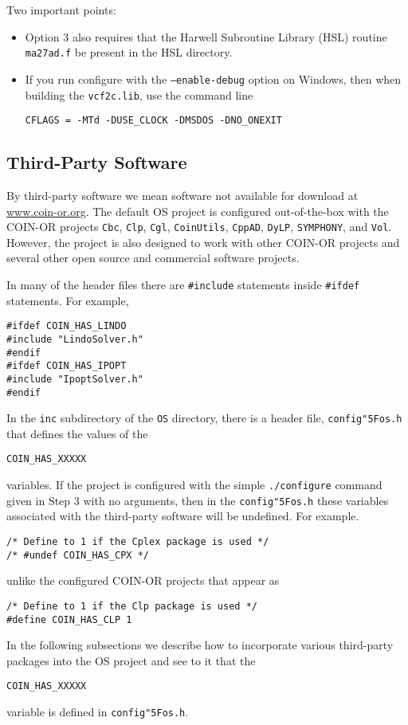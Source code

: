 \documentclass[11pt]{article}
\renewcommand{\_}{{\char"5F}}
\renewcommand{\{}{{\char"7B}}
\renewcommand{\}}{{\char"7D}}
\renewcommand{\^}{{\char"0D}}
\renewcommand{\'}{{\char"0D}}
\begin{document}
\noindent Two important points:


\begin{itemize}
\item Option 3 also requires that the  Harwell Subroutine Library (HSL) routine {\tt ma27ad.f} be present in the HSL directory.

\item If you run configure with the {\tt --enable-debug} option on Windows, then when building the {\tt vcf2c.lib}, use the command line

\begin{verbatim}
CFLAGS = -MTd -DUSE_CLOCK -DMSDOS -DNO_ONEXIT
\end{verbatim}

\end{itemize}





\subsection{Third-Party Software}

By third-party software we mean software not available for download at \url{www.coin-or.org}. The default OS project is configured out-of-the-box with the COIN-OR  projects {\tt Cbc}, {\tt Clp}, {\tt Cgl}, {\tt CoinUtils}, {\tt CppAD},  {\tt DyLP}, {\tt SYMPHONY}, and {\tt Vol}.  However, the project is also designed to work with other COIN-OR projects and several other open source and commercial software projects.

In many of the header files there are {\tt \#include} statements inside {\tt  \#ifdef}  statements. For example,
\begin{verbatim}
#ifdef COIN_HAS_LINDO
#include "LindoSolver.h"
#endif
#ifdef COIN_HAS_IPOPT
#include "IpoptSolver.h"
#endif
\end{verbatim}
In the {\tt inc} subdirectory of the {\tt OS}  directory, there is a header file, {\tt config\_os.h} that defines the values of the
\begin{verbatim}
COIN_HAS_XXXXX
\end{verbatim}
variables. If the project is configured with the simple {\tt ./configure} command given in Step 3 with no arguments, then in the {\tt config\_os.h} these variables associated with the third-party software will be undefined. For example.
\begin{verbatim}
/* Define to 1 if the Cplex package is used */
/* #undef COIN_HAS_CPX */
\end{verbatim}
unlike the configured COIN-OR projects that appear as
\begin{verbatim}
/* Define to 1 if the Clp package is used */
#define COIN_HAS_CLP 1
\end{verbatim}
In the following subsections we  describe how to incorporate various  third-party packages into the OS project and see to it that the
\begin{verbatim}
COIN_HAS_XXXXX
\end{verbatim}
variable is defined in  {\tt config\_os.h}.
\end{document}
